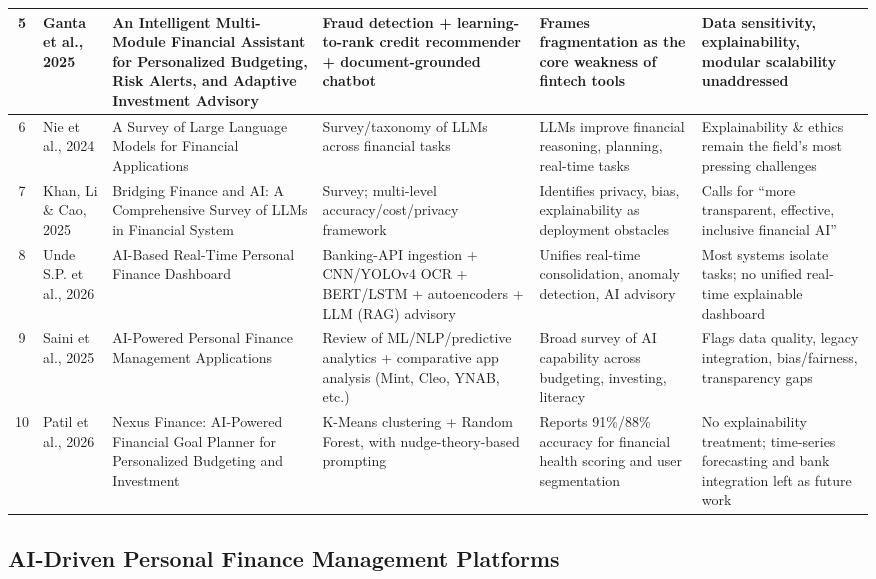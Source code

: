 \documentclass[conference]{IEEEtran}
\begin{document}
\begin{table}[!t]
\begin{tabular}{|c|p{2.3cm}|p{4.3cm}|p{3.6cm}|p{3.3cm}|p{3.3cm}|}
\hline
5 & Ganta et al., 2025 \cite{ganta2025multimodule} & An Intelligent Multi-Module Financial Assistant for Personalized Budgeting, Risk Alerts, and Adaptive Investment Advisory & Fraud detection + learning-to-rank credit recommender + document-grounded chatbot & Frames fragmentation as the core weakness of fintech tools & Data sensitivity, explainability, modular scalability unaddressed \\
\hline
6 & Nie et al., 2024 \cite{nie2024survey} & A Survey of Large Language Models for Financial Applications & Survey/taxonomy of LLMs across financial tasks & LLMs improve financial reasoning, planning, real-time tasks & Explainability \& ethics remain the field's most pressing challenges \\
\hline
7 & Khan, Li \& Cao, 2025 \cite{khan2025bridging} & Bridging Finance and AI: A Comprehensive Survey of LLMs in Financial System & Survey; multi-level accuracy/cost/privacy framework & Identifies privacy, bias, explainability as deployment obstacles & Calls for ``more transparent, effective, inclusive financial AI'' \\
\hline
8 & Unde S.P. et al., 2026 \cite{unde2026dashboard} & AI-Based Real-Time Personal Finance Dashboard & Banking-API ingestion + CNN/YOLOv4 OCR + BERT/LSTM + autoencoders + LLM (RAG) advisory & Unifies real-time consolidation, anomaly detection, AI advisory & Most systems isolate tasks; no unified real-time explainable dashboard \\
\hline
9 & Saini et al., 2025 \cite{saini2025aipowered} & AI-Powered Personal Finance Management Applications & Review of ML/NLP/predictive analytics + comparative app analysis (Mint, Cleo, YNAB, etc.) & Broad survey of AI capability across budgeting, investing, literacy & Flags data quality, legacy integration, bias/fairness, transparency gaps \\
\hline
10 & Patil et al., 2026 \cite{patil2026nexus} & Nexus Finance: AI-Powered Financial Goal Planner for Personalized Budgeting and Investment & K-Means clustering + Random Forest, with nudge-theory-based prompting & Reports 91\%/88\% accuracy for financial health scoring and user segmentation & No explainability treatment; time-series forecasting and bank integration left as future work \\
\hline
\end{tabular}
\end{table}

\subsection{AI-Driven Personal Finance Management Platforms}
\end{document}

